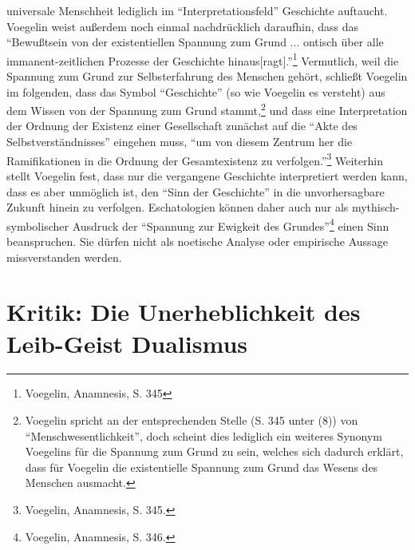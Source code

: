 universale Menschheit lediglich im "`Interpretationsfeld"' Geschichte
auftaucht. Voegelin weist außerdem noch einmal nachdrücklich daraufhin, dass
das "`Bewußtsein von der existentiellen Spannung zum Grund ... ontisch über
alle immanent-zeitlichen Prozesse der Geschichte
hinaus[ragt]."'\footnote{Voegelin, Anamnesis, S. 345} Vermutlich, weil die
Spannung zum Grund zur Selbsterfahrung des Menschen gehört, schließt Voegelin
im folgenden, dass das Symbol "`Geschichte"' (so wie Voegelin es versteht) aus
dem Wissen von der Spannung zum Grund stammt,\footnote{Voegelin spricht an der
  entsprechenden Stelle (S. 345 unter (8)) von "`Menschwesentlichkeit"', doch
  scheint dies lediglich ein weiteres Synonym Voegelins für die Spannung zum
  Grund zu sein, welches sich dadurch erklärt, dass für Voegelin die
  existentielle Spannung zum Grund das Wesens des Menschen ausmacht.} und dass
eine Interpretation der Ordnung der Existenz einer Gesellschaft zunächst auf
die "`Akte des Selbstverständnisses"' eingehen muss, "`um von diesem Zentrum
her die Ramifikationen in die Ordnung der Gesamtexistenz zu
verfolgen."'\footnote{Voegelin, Anamnesis, S. 345.} Weiterhin stellt Voegelin
fest, dass nur die vergangene Geschichte interpretiert werden kann, dass es
aber unmöglich ist, den "`Sinn der Geschichte"' in die unvorhersagbare Zukunft
hinein zu verfolgen. Eschatologien können daher auch nur als
mythisch-symbolischer Ausdruck der "`Spannung zur Ewigkeit des
Grundes"'\footnote{Voegelin, Anamnesis, S. 346.} einen Sinn beanspruchen. Sie
dürfen nicht als noetische Analyse oder empirische Aussage missverstanden
werden.

\section{Kritik: Die Unerheblichkeit des Leib-Geist Dualismus}

